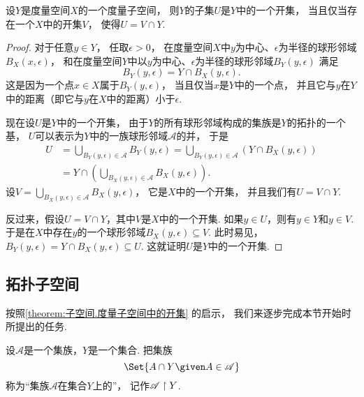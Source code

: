 \begin{theorem}\label{theorem:子空间.度量子空间中的开集}
设\(Y\)是度量空间\(X\)的一个度量子空间，
则\(Y\)的子集\(U\)是\(Y\)中的一个开集，
当且仅当存在一个\(X\)中的开集\(V\)，
使得\(U = V \cap Y\).
\begin{proof}
对于任意\(y \in Y\)，
任取\(\epsilon>0\)，
在度量空间\(X\)中\(y\)为中心、\(\epsilon\)为半径的球形邻域\(B_X(x,\epsilon)\)，
和在度量空间\(Y\)中以\(y\)为中心、\(\epsilon\)为半径的球形邻域\(B_Y(y,\epsilon)\)
满足\begin{equation*}
	B_Y(y,\epsilon)
	= Y \cap B_X(y,\epsilon).
\end{equation*}
这是因为一个点\(x \in X\)属于\(B_Y(y,\epsilon)\)，
当且仅当\(x\)是\(Y\)中的一个点，
并且它与\(y\)在\(Y\)中的距离（即它与\(y\)在\(X\)中的距离）小于\(\epsilon\).

现在设\(U\)是\(Y\)中的一个开集，
由于\(Y\)的所有球形邻域构成的集族是\(Y\)的拓扑的一个基，
\(U\)可以表示为\(Y\)中的一族球形邻域\(\mathscr{A}\)的并，
于是\begin{align*}
	U &= \bigcup_{B_Y(y,\epsilon) \in \mathscr{A}} B_Y(y,\epsilon)
	= \bigcup_{B_Y(y,\epsilon) \in \mathscr{A}} \left( Y \cap B_X(y,\epsilon) \right) \\
	&= Y \cap \left( \bigcup_{B_X(y,\epsilon) \in \mathscr{A}} B_X(y,\epsilon) \right).
\end{align*}
设\(V = \bigcup_{B_X(y,\epsilon) \in \mathscr{A}} B_X(y,\epsilon)\)，
它是\(X\)中的一个开集，
并且我们有\(U = V \cap Y\).

反过来，假设\(U = V \cap Y\)，其中\(V\)是\(X\)中的一个开集.
如果\(y \in U\)，则有\(y \in Y\)和\(y \in V\).
于是在\(X\)中存在\(y\)的一个球形邻域\(B_X(y,\epsilon) \subseteq V\).
此时易见，\(B_Y(y,\epsilon) = Y \cap B_X(y,\epsilon) \subseteq U\).
这就证明\(U\)是\(Y\)中的一个开集.
\end{proof}
\end{theorem}

\subsection{拓扑子空间}
按照\cref{theorem:子空间.度量子空间中的开集} 的启示，
我们来逐步完成本节开始时所提出的任务.

\begin{definition}\label{definition:子空间.拓扑子空间中的集族的限制}
设\(\mathscr{A}\)是一个集族，\(Y\)是一个集合.
把集族\begin{equation*}
	\Set{ A \cap Y \given A \in \mathscr{A} }
\end{equation*}
称为“集族\(\mathscr{A}\)在集合\(Y\)上的”，
记作\(\mathscr{A} \upharpoonright Y\).
\end{definition}

